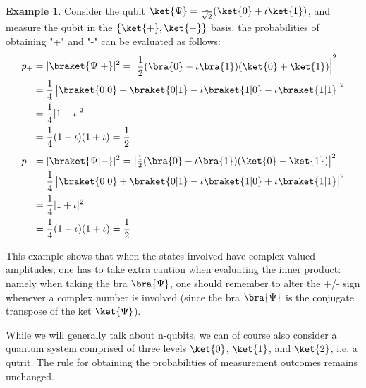 \documentclass[12pt, oneside]{book}
\theoremstyle{definition}
\theoremstyle{definition}
\newtheorem{example}{Example}[section]
\theoremstyle{remark}
\begin{document}
\begin{example}
    Consider the qubit $\ket{\Psi}=\frac{1}{\sqrt{2}}(\ket{0}+\iota\ket{1})$, and measure the qubit in the $\{\ket{+},\ket{-}\}$ basis. the probabilities of obtaining "+" and "-" can be evaluated as follows:
    \begin{align*}
    p_+&=|\braket{\Psi|+}|^2=\begin{vmatrix} \dfrac{1}{2}(\bra{0}-\iota \bra{1})(\ket{0}+\ket{1})\end{vmatrix}^2\\
    &=\frac{1}{4}\begin{vmatrix} \braket{0|0}+\braket{0|1} - \iota\braket{1|0} - \iota \braket{1|1} \end{vmatrix}^2\\
    &=\frac{1}{4}|1-\iota|^2\\
    &=\frac{1}{4}(1-\iota)(1+\iota)=\frac{1}{2}
    \end{align*}
    \begin{align*}
    p_-&=|\braket{\Psi|-}|^2=\begin{vmatrix} \frac{1}{2}(\bra{0}-\iota \bra{1})(\ket{0}-\ket{1})\end{vmatrix}^2\\
    &=\frac{1}{4}\begin{vmatrix} \braket{0|0}+\braket{0|1} - \iota\braket{1|0} + \iota \braket{1|1} \end{vmatrix}^2\\
    &=\frac{1}{4}|1+\iota|^2\\
    &=\frac{1}{4}(1-\iota)(1+\iota)=\frac{1}{2}
    \end{align*}
\end{example}
This example shows that when the states involved have complex-valued amplitudes, one has to
take extra caution when evaluating the inner product: namely when taking the bra $\bra{\Psi}$, one should remember to alter the +/- sign whenever a complex number is involved (since the bra $\bra{\Psi}$ is the
conjugate transpose of the ket $\ket{\Psi}$). 

While we will generally talk about n-qubits, we can of course also consider a quantum system
comprised of three levels $\ket{0}$, $\ket{1}$, and $\ket{2}$, i.e. a qutrit. The rule for obtaining the probabilities of
measurement outcomes remains unchanged.
\end{document}
